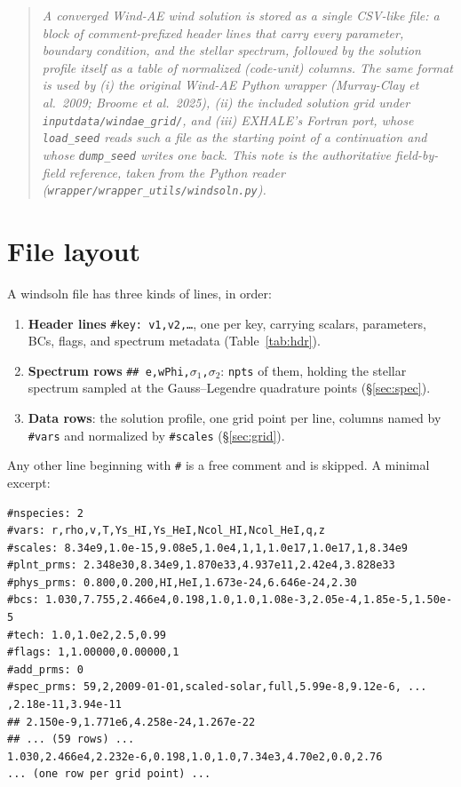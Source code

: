 \documentclass[english,a4paper]{my_memo}
\newcommand{\code}[1]{\texttt{#1}}
\newcommand{\hd}[1]{\code{\##1}}      %
\begin{document}
\begin{quote}\small\itshape
A converged Wind-AE wind solution is stored as a single CSV-like file: a
block of comment-prefixed header lines that carry every parameter,
boundary condition, and the stellar spectrum, followed by the solution
profile itself as a table of normalized (code-unit) columns. The same
format is used by (i) the original Wind-AE Python wrapper (Murray-Clay et
al.\ 2009; Broome et al.\ 2025), (ii) the included solution grid under
\code{inputdata/windae\_grid/}, and (iii) EXHALE's Fortran port, whose
\code{load\_seed} reads such a file as the starting point of a
continuation and whose \code{dump\_seed} writes one back. This note is the
authoritative field-by-field reference, taken from the Python reader
(\code{wrapper/wrapper\_utils/windsoln.py}).
\end{quote}

\section{File layout}
A windsoln file has three kinds of lines, in order:
\begin{enumerate}\itemsep2pt
  \item \textbf{Header lines} \code{\#key: v1,v2,\dots}, one per key,
        carrying scalars, parameters, BCs, flags, and spectrum metadata
        (Table~\ref{tab:hdr}).
  \item \textbf{Spectrum rows} \code{\#\# e,wPhi,$\sigma_1$,$\sigma_2$}:
        \code{npts} of them, holding the stellar spectrum sampled at
        the Gauss--Legendre quadrature points (\S\ref{sec:spec}).
  \item \textbf{Data rows}: the solution profile, one grid point per
        line, columns named by \hd{vars} and normalized by \hd{scales}
        (\S\ref{sec:grid}).
\end{enumerate}
Any other line beginning with \code{\#} is a free comment and is skipped.
A minimal excerpt:
\begin{verbatim}
#nspecies: 2
#vars: r,rho,v,T,Ys_HI,Ys_HeI,Ncol_HI,Ncol_HeI,q,z
#scales: 8.34e9,1.0e-15,9.08e5,1.0e4,1,1,1.0e17,1.0e17,1,8.34e9
#plnt_prms: 2.348e30,8.34e9,1.870e33,4.937e11,2.42e4,3.828e33
#phys_prms: 0.800,0.200,HI,HeI,1.673e-24,6.646e-24,2.30
#bcs: 1.030,7.755,2.466e4,0.198,1.0,1.0,1.08e-3,2.05e-4,1.85e-5,1.50e-5
#tech: 1.0,1.0e2,2.5,0.99
#flags: 1,1.00000,0.00000,1
#add_prms: 0
#spec_prms: 59,2,2009-01-01,scaled-solar,full,5.99e-8,9.12e-6, ... ,2.18e-11,3.94e-11
## 2.150e-9,1.771e6,4.258e-24,1.267e-22
## ... (59 rows) ...
1.030,2.466e4,2.232e-6,0.198,1.0,1.0,7.34e3,4.70e2,0.0,2.76
... (one row per grid point) ...
\end{verbatim}
\end{document}
